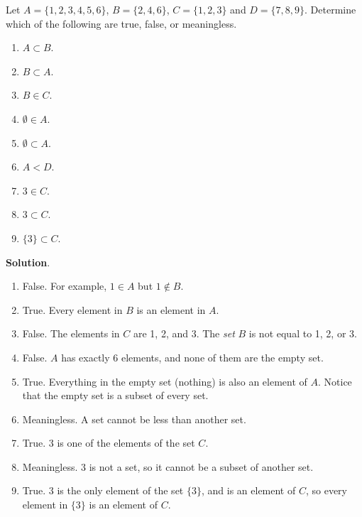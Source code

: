 \documentclass[11pt,]{book}
\theoremstyle{ptxplainnotitle}
\theoremstyle{ptxplaintitle}
\theoremstyle{ptxdefinitionnotitle}
\theoremstyle{ptxdefinitiontitle}
\theoremstyle{ptxdefinitionnotitle}
\theoremstyle{ptxdefinitiontitle}
\theoremstyle{ptxdefinitionnotitle}
\theoremstyle{ptxdefinitiontitle}
\theoremstyle{ptxdefinitiontitlenonumber}
\theoremstyle{ptxdefinitiontitlenonumber}
\numberwithin{equation}{chapter}
\newcommand{\lt}{<}
\begin{document}
\begin{example}\label{example-29}
\hypertarget{p-754}{}%
Let \(A = \{1, 2, 3, 4, 5, 6\}\), \(B = \{2, 4, 6\}\), \(C = \{1, 2, 3\}\) and \(D = \{7, 8, 9\}\). Determine which of the following are true, false, or meaningless.%
\par
\hypertarget{p-755}{}%
\leavevmode%
\begin{enumerate}
\item\hypertarget{li-295}{}\(A \subset B\).%
\item\hypertarget{li-296}{}\(B \subset A\).%
\item\hypertarget{li-297}{}\(B \in C\).%
\item\hypertarget{li-298}{}\(\emptyset \in A\).%
\item\hypertarget{li-299}{}\(\emptyset \subset A\).%
\item\hypertarget{li-300}{}\(A \lt  D\).%
\item\hypertarget{li-301}{}\(3 \in C\).%
\item\hypertarget{li-302}{}\(3 \subset C\).%
\item\hypertarget{li-303}{}\(\{3\} \subset C\).%
\end{enumerate}
%
\par\smallskip%
\noindent\textbf{Solution}.\hypertarget{solution-101}{}\quad%
\hypertarget{p-756}{}%
\leavevmode%
\begin{enumerate}
\item\hypertarget{li-304}{}\hypertarget{p-757}{}%
False. For example, \(1\in A\) but \(1 \notin B\).%
\item\hypertarget{li-305}{}\hypertarget{p-758}{}%
True. Every element in \(B\) is an element in \(A\).%
\item\hypertarget{li-306}{}\hypertarget{p-759}{}%
False. The elements in \(C\) are 1, 2, and 3. The \emph{set} \(B\) is not equal to 1, 2, or 3.%
\item\hypertarget{li-307}{}\hypertarget{p-760}{}%
False. \(A\) has exactly 6 elements, and none of them are the empty set.%
\item\hypertarget{li-308}{}\hypertarget{p-761}{}%
True. Everything in the empty set (nothing) is also an element of \(A\). Notice that the empty set is a subset of every set.%
\item\hypertarget{li-309}{}\hypertarget{p-762}{}%
Meaningless. A set cannot be less than another set.%
\item\hypertarget{li-310}{}\hypertarget{p-763}{}%
True. \(3\) is one of the elements of the set \(C\).%
\item\hypertarget{li-311}{}\hypertarget{p-764}{}%
Meaningless. \(3\) is not a set, so it cannot be a subset of another set.%
\item\hypertarget{li-312}{}\hypertarget{p-765}{}%
True. \(3\) is the only element of the set \(\{3\}\), and is an element of \(C\), so every element in \(\{3\}\) is an element of \(C\).%
\end{enumerate}
%
\end{example}
\end{document}

